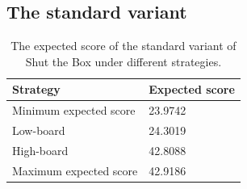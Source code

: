 



\subsection{The standard variant}
\label{cs1:stb_standard}

\begin{table}[h]
    \centering
    \begin{tabular}{@{}ll@{}}
    \toprule
    Strategy                   & Expected score     \\ \midrule
    \multicolumn{1}{l|}{Minimum expected score}    & 23.9742  \\
    \multicolumn{1}{l|}{Low-board}  & 24.3019 \\
    \multicolumn{1}{l|}{High-board} & 42.8088 \\
    \multicolumn{1}{l|}{Maximum expected score}    & 42.9186
    \end{tabular}
    \caption{The expected score of the standard variant of Shut the Box under different strategies.}
    \label{cs1:exp_value_results}
\end{table}

